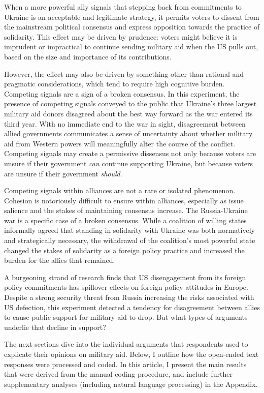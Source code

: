 When a more powerful ally signals that stepping back from commitments to Ukraine is an acceptable and legitimate strategy, it permits voters to dissent from the mainstream political consensus and express opposition towards the practice of solidarity. This effect may be driven by prudence: voters might believe it is imprudent or impractical to continue sending military aid when the US pulls out, based on the size and importance of its contributions. 

However, the effect may also be driven by something other than rational and pragmatic considerations, which tend to require high cognitive burden. Competing signals are a sign of a broken consensus. In this experiment, the presence of competing signals conveyed to the public that Ukraine's three largest military aid donors disagreed about the best way forward as the war entered its third year. With no immediate end to the war in sight, disagreement between allied governments communicates a sense of uncertainty about whether military aid from Western powers will meaningfully alter the course of the conflict. Competing signals may create a permissive dissensus not only because voters are unsure if their government \emph{can} continue supporting Ukraine, but because voters are unsure if their government \emph{should}. 

Competing signals within alliances are not a rare or isolated phenomenon. Cohesion is notoriously difficult to ensure within alliances, especially as issue salience and the stakes of maintaining consensus increase. The Russia-Ukraine war is a specific case of a broken consensus. While a coalition of willing states informally agreed that standing in solidarity with Ukraine was both normatively and strategically necessary, the withdrawal of the coalition's most powerful state changed the stakes of solidarity as a foreign policy practice and increased the burden for the allies that remained.   

A burgeoning strand of research finds that US disengagement from its foreign policy commitments has spillover effects on foreign policy attitudes in Europe.\autocite{blankenship_threats_2024, jakobbarrett_how_2026} Despite a strong security threat from Russia increasing the risks associated with US defection, this experiment detected a tendency for disagreement between allies to cause public support for military aid to drop. But what types of arguments underlie that decline in support? 

The next sections dive into the individual arguments that respondents used to explicate their opinions on military aid. Below, I outline how the open-ended text responses were processed and coded. In this article, I present the main results that were derived from the manual coding procedure, and include further supplementary analyses (including natural language processing) in the Appendix. 

